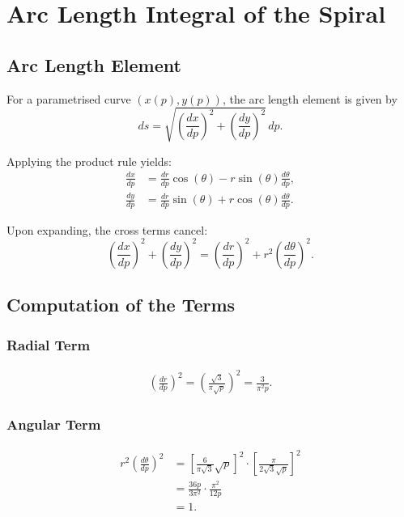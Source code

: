 \chapter{Arc Length Integral of the Spiral}\label{sec:bogenlaenge}

\section{Arc Length Element}

For a parametrised curve $(x(p), y(p))$, the arc length element is given by
\begin{equation}
ds = \sqrt{\left(\frac{dx}{dp}\right)^2 + \left(\frac{dy}{dp}\right)^2}\, dp.
\end{equation}

Applying the product rule yields:
\begin{equation}
\begin{aligned}
\frac{dx}{dp} &= \frac{dr}{dp}\cos(\theta)
               - r\sin(\theta)\frac{d\theta}{dp}, \\[6pt]
\frac{dy}{dp} &= \frac{dr}{dp}\sin(\theta)
               + r\cos(\theta)\frac{d\theta}{dp}.
\end{aligned}
\end{equation}

Upon expanding, the cross terms cancel:
\begin{equation}
\left(\frac{dx}{dp}\right)^2
+ \left(\frac{dy}{dp}\right)^2
= \left(\frac{dr}{dp}\right)^2
+ r^2\left(\frac{d\theta}{dp}\right)^2.
\end{equation}

\section{Computation of the Terms}

\subsection*{Radial Term}
\begin{align}
\left(\frac{dr}{dp}\right)^2
= \left(\frac{\sqrt{3}}{\pi\sqrt{p}}\right)^2
= \frac{3}{\pi^2 p}.
\end{align}

\subsection*{Angular Term}
\begin{align}
r^2\left(\frac{d\theta}{dp}\right)^2
&= \left[\frac{6}{\pi\sqrt{3}}\sqrt{p}\right]^2
   \cdot
   \left[\frac{\pi}{2\sqrt{3}\sqrt{p}}\right]^2 \\[4pt]
&= \frac{36p}{3\pi^2}
   \cdot
   \frac{\pi^2}{12p} \\[4pt]
&= 1.
\end{align}

